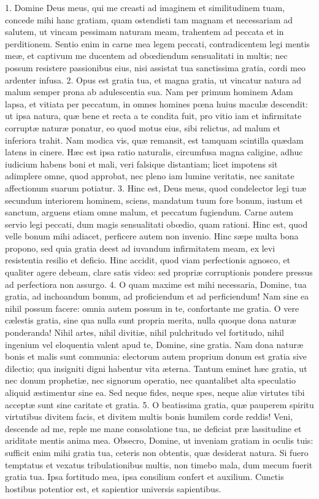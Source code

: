 1. Domine Deus meus, qui me creasti ad imaginem et similitudinem tuam, concede mihi hanc gratiam, quam ostendisti tam magnam et necessariam ad salutem, ut vincam pessimam naturam meam, trahentem ad peccata et in perditionem. Sentio enim in carne mea legem peccati, contradicentem legi mentis meæ, et captivum me ducentem ad obœdiendum sensualitati in multis; nec possum resistere passionibus eius, nisi assistat tua sanctissima gratia, cordi meo ardenter infusa.
2. Opus est gratia tua, et magna gratia, ut vincatur natura ad malum semper prona ab adulescentia sua. Nam per primum hominem Adam lapsa, et vitiata per peccatum, in omnes homines pœna huius maculæ descendit: ut ipsa natura, quæ bene et recta a te condita fuit, pro vitio iam et infirmitate corruptæ naturæ ponatur, eo quod motus eius, sibi relictus, ad malum et inferiora trahit. Nam modica vis, quæ remansit, est tamquam scintilla quædam latens in cinere. Hæc est ipsa ratio naturalis, circumfusa magna caligine, adhuc iudicium habens boni et mali, veri falsique distantiam; licet impotens sit adimplere omne, quod approbat, nec pleno iam lumine veritatis, nec sanitate affectionum suarum potiatur.
3. Hinc est, Deus meus, quod condelector legi tuæ secundum interiorem hominem, sciens, mandatum tuum fore bonum, iustum et sanctum, arguens etiam omne malum, et peccatum fugiendum. Carne autem servio legi peccati, dum magis sensualitati obœdio, quam rationi. Hinc est, quod velle bonum mihi adiacet, perficere autem non invenio. Hinc sæpe multa bona propono, sed quia gratia deest ad iuvandum infirmitatem meam, ex levi resistentia resilio et deficio. Hinc accidit, quod viam perfectionis agnosco, et qualiter agere debeam, clare satis video: sed propriæ corruptionis pondere pressus ad perfectiora non assurgo.
4. O quam maxime est mihi necessaria, Domine, tua gratia, ad inchoandum bonum, ad proficiendum et ad perficiendum! Nam sine ea nihil possum facere: omnia autem possum in te, confortante me gratia. O vere cælestis gratia, sine qua nulla sunt propria merita, nulla quoque dona naturæ ponderanda! Nihil artes, nihil divitiæ, nihil pulchritudo vel fortitudo, nihil ingenium vel eloquentia valent apud te, Domine, sine gratia. Nam dona naturæ bonis et malis sunt communia: electorum autem proprium donum est gratia sive dilectio; qua insigniti digni habentur vita æterna. Tantum eminet hæc gratia, ut nec donum prophetiæ, nec signorum operatio, nec quantalibet alta speculatio aliquid æstimentur sine ea. Sed neque fides, neque spes, neque aliæ virtutes tibi acceptæ sunt sine caritate et gratia.
5. O beatissima gratia, quæ pauperem spiritu virtutibus divitem facis, et divitem multis bonis humilem corde reddis! Veni, descende ad me, reple me mane consolatione tua, ne deficiat præ lassitudine et ariditate mentis anima mea. Obsecro, Domine, ut inveniam gratiam in oculis tuis: sufficit enim mihi gratia tua, ceteris non obtentis, quæ desiderat natura. Si fuero temptatus et vexatus tribulationibus multis, non timebo mala, dum mecum fuerit gratia tua. Ipsa fortitudo mea, ipsa consilium confert et auxilium. Cunctis hostibus potentior est, et sapientior universis sapientibus.
